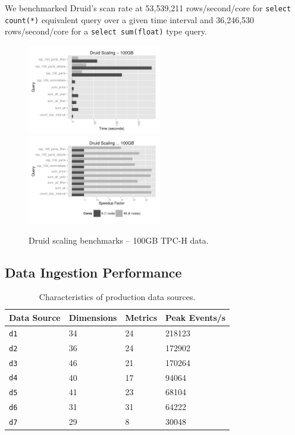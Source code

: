 \documentclass{vldb}
\begin{document}
We benchmarked Druid's scan rate at 53,539,211
rows/second/core for \texttt{select count(*)} equivalent query over a given
time interval and 36,246,530 rows/second/core for a \texttt{select sum(float)}
type query.

\begin{figure}
\centering
\includegraphics[width = 2.3in]{tpch_scaling}
\includegraphics[width = 2.3in]{tpch_scaling_factor}
\caption{Druid scaling benchmarks -- 100GB TPC-H data.}
\label{fig:tpch_scaling}
\end{figure}

\subsection{Data Ingestion Performance}
\begin{table}
  \centering
  \scriptsize\begin{tabular}{| l | l | l | l |}
    \hline
    \textbf{Data Source} & \textbf{Dimensions} & \textbf{Metrics} & \textbf{Peak Events/s} \\ \hline
    \texttt{d1} & 34 & 24 & 218123 \\ \hline
    \texttt{d2} & 36 & 24 & 172902 \\ \hline
    \texttt{d3} & 46 & 21 & 170264 \\ \hline
    \texttt{d4} & 40 & 17 & 94064 \\ \hline
    \texttt{d5} & 41 & 23 & 68104 \\ \hline
    \texttt{d6} & 31 & 31 & 64222 \\ \hline
    \texttt{d7} & 29 & 8 & 30048 \\ \hline
  \end{tabular}
  \normalsize
  \caption{Characteristics of production data sources.}
  \label{tab:ingestion}
\end{table}
\end{document}
